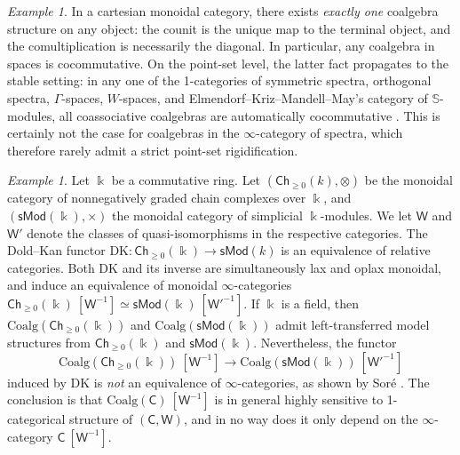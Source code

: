 \documentclass{proc-l}
\theoremstyle{plain}
\theoremstyle{definition}
\theoremstyle{remark}
\newtheorem{example}[{theorem}]{Example}
\newcommand{\kk}{\Bbbk}
\begin{document}
\begin{example}%
\label{Example:1.6}In a cartesian monoidal category, there exists \emph{exactly one} coalgebra structure on any object: the counit is the unique map to the terminal object, and the comultiplication is necessarily the diagonal. In particular, any coalgebra in spaces is cocommutative. On the point-set level, the latter fact propagates to the stable setting: in any one of the 1-categories of symmetric spectra, orthogonal spectra, $\Gamma$-spaces, $W$-spaces, and Elmendorf--Kriz--Mandell--May's category of $\mathbb S$-modules, all coassociative coalgebras are automatically cocommutative \cite{ps}. This is certainly not the case for coalgebras in the $\infty$-category of spectra, which therefore rarely admit a strict point-set rigidification.
\end{example}

\begin{example}%
\label{Example:1.7}Let $\kk$ be a commutative ring. Let $(\mathsf{Ch}_{\geq 0}(k),\otimes)$ be the monoidal category of nonnegatively graded chain complexes over $\kk$, and $(\mathsf{sMod}(\kk),\times)$ the monoidal category of simplicial $\kk$-modules. We let $\mathsf W$ and $\mathsf W'$ denote the classes of quasi-isomorphisms in the respective categories. The Dold--Kan functor
$\mathrm{DK} : \mathsf{Ch}_{\geq 0}(\kk) \longrightarrow \mathsf{sMod}(k)$
is an equivalence of relative categories. Both $\mathrm{DK}$ and its inverse are simultaneously lax and oplax monoidal, and induce an equivalence of monoidal $\infty$-categories $\mathsf{Ch}_{\geq 0}(\kk)~[\mathsf W^{-1}] \simeq \mathsf{sMod}(\kk)~[\mathsf W'^{-1}]$. If $\kk$ is a field, then $\mathrm{Coalg}(\mathsf{Ch}_{\geq 0}(\kk))$ and $\mathrm{Coalg}(\mathsf{sMod}(\kk))$ admit left-transferred model structures from $\mathsf{Ch}_{\geq 0}(\kk)$ and $\mathsf{sMod}(\kk)$. Nevertheless, the  functor
\[
\mathrm{Coalg}(\mathsf{Ch}_{\geq 0}(\kk))~[\mathsf W^{-1}] \longrightarrow \mathrm{Coalg}(\mathsf{sMod}(\kk))~[\mathsf W'^{-1}]
\]
induced by $\mathrm{DK}$ is \emph{not} an equivalence of $\infty$-categories, as shown by Sor\'e \cite{sore}. The conclusion is that $\mathrm{Coalg}(\mathsf C)~[\mathsf W^{-1}]$ is in general highly sensitive to 1-categorical structure of $(\mathsf C,\mathsf W)$, and in no way does it only depend on the $\infty$-category $\mathsf C~[\mathsf W^{-1}]$.
\end{example}
\end{document}
